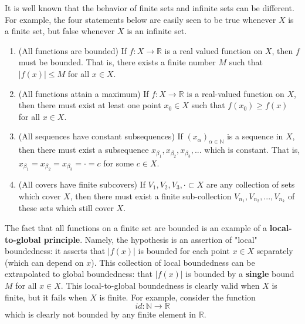     It is well known that the behavior of finite sets and infinite sets can be different. For example, the four statements below are easily seen to be true whenever $X$ is a finite set, but false whenever $X$ is an infinite set. 
    \begin{enumerate}
        \item (All functions are bounded) If $f: X \longrightarrow \mathbb{R}$ is a real valued function on $X$, then $f$ must be bounded. That is, there exists a finite number $M$ such that $|f(x)| \leq M$ for all $x \in X$. 
        \item (All functions attain a maximum) If $f: X \longrightarrow \mathbb{R}$ is a real-valued function on $X$, then there must exist at least one point $x_0 \in X$ such that $f(x_0) \geq f(x)$ for all $x \in X$. 
        \item (All sequences have constant subsequences) If $(x_\alpha)_{\alpha \in \mathbb{N}}$ is a sequence in $X$, then there must exist a subsequence $x_{\beta_1}, x_{\beta_2}, x_{\beta_3}, ...$ which is constant. That is, $x_{\beta_1} = x_{\beta_2} = x_{\beta_3} = \cdot = c$ for some $c \in X$. 
        \item (All covers have finite subcovers) If $V_1, V_2, V_3, \cdot \subset X$ are any collection of sets which cover $X$, then there must exist a finite sub-collection $V_{n_1}, V_{n_2}, ..., V_{n_k}$ of these sets which still cover $X$. 
    \end{enumerate}

    The fact that all functions on a finite set are bounded is an example of a \textbf{local-to-global principle}. Namely, the hypothesis is an assertion of "local" boundedness: it asserts that $|f(x)|$ is bounded for each point $x \in X$ separately (which can depend on $x$). This collection of local boundedness can be extrapolated to global boundedness: that $|f(x)|$ is bounded by a \textbf{single} bound $M$ for all $x \in X$. This local-to-global boundedness is clearly valid when $X$ is finite, but it fails when $X$ is finite. For example, consider the function
    \[id: \mathbb{N} \longrightarrow \mathbb{R}\]
    which is clearly not bounded by any finite element in $\mathbb{R}$. 

